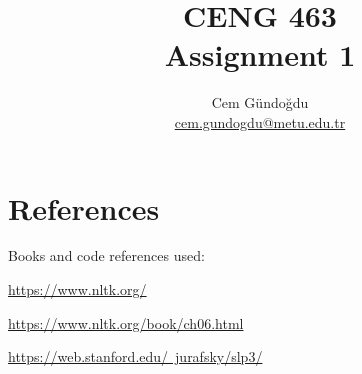 \documentclass[a4paper, 10pt]{article}
\author{Cem Gündoğdu\\\href{mailto:cem.gundogdu@metu.edu.tr}{cem.gundogdu@metu.edu.tr}}
\title{CENG 463\\Assignment 1}
\begin{document}
\maketitle
\tableofcontents



\pagebreak

\section{References}

Books and code references used:

\href{https://www.nltk.org/}{https://www.nltk.org/}

\href{https://www.nltk.org/book/ch06.html}{https://www.nltk.org/book/ch06.html}

\href{https://web.stanford.edu/~jurafsky/slp3/}{https://web.stanford.edu/~jurafsky/slp3/}
\end{document}
